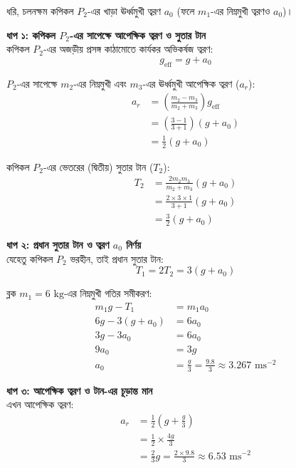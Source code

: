 \documentclass[12pt, a4paper]{article}
\begin{document}
\begin{tcolorbox}[solutionbox={সমাধান (Solution)}]
    \noindent
    ধরি, চলনক্ষম কপিকল $P_2$-এর খাড়া ঊর্ধ্বমুখী ত্বরণ $a_0$ (ফলে $m_1$-এর নিম্নমুখী ত্বরণও $a_0$)। 
    
    \vspace{0.5em}
    \noindent\textbf{ধাপ ১: কপিকল $P_2$-এর সাপেক্ষে আপেক্ষিক ত্বরণ ও সুতার টান} \\
    কপিকল $P_2$-এর অজড়ীয় প্রসঙ্গ কাঠামোতে কার্যকর অভিকর্ষজ ত্বরণ:
    \[ g_{\text{eff}} = g + a_0 \]
    
    $P_2$-এর সাপেক্ষে $m_2$-এর নিম্নমুখী এবং $m_3$-এর ঊর্ধ্বমুখী আপেক্ষিক ত্বরণ ($a_r$):
    \begin{align*}
        a_r &= \left(\frac{m_2 - m_3}{m_2 + m_3}\right) g_{\text{eff}} \\
            &= \left(\frac{3 - 1}{3 + 1}\right) (g + a_0) \\
            &= \frac{1}{2} (g + a_0)
    \end{align*}
    
    কপিকল $P_2$-এর ভেতরের (দ্বিতীয়) সুতার টান ($T_2$):
    \begin{align*}
        T_2 &= \frac{2 m_2 m_3}{m_2 + m_3} (g + a_0) \\
            &= \frac{2 \times 3 \times 1}{3 + 1} (g + a_0) \\
            &= \frac{3}{2} (g + a_0)
    \end{align*}
    
    \vspace{0.5em}
    \noindent\textbf{ধাপ ২: প্রধান সুতার টান ও ত্বরণ $a_0$ নির্ণয়} \\
    যেহেতু কপিকল $P_2$ ভরহীন, তাই প্রধান সুতার টান:
    \[ T_1 = 2 T_2 = 3 (g + a_0) \]
    
    ব্লক $m_1 = 6\text{ kg}$-এর নিম্নমুখী গতির সমীকরণ:
    \begin{align*}
        m_1 g - T_1 &= m_1 a_0 \\
        6g - 3(g + a_0) &= 6 a_0 \\
        3g - 3a_0 &= 6a_0 \\
        9a_0 &= 3g \\
        a_0 &= \frac{g}{3} = \frac{9.8}{3} \approx 3.267\text{ ms}^{-2}
    \end{align*}
    
    \vspace{0.5em}
    \noindent\textbf{ধাপ ৩: আপেক্ষিক ত্বরণ ও টান-এর চূড়ান্ত মান} \\
    এখন আপেক্ষিক ত্বরণ:
    \begin{align*}
        a_r &= \frac{1}{2} \left(g + \frac{g}{3}\right) \\
            &= \frac{1}{2} \times \frac{4g}{3} \\
            &= \frac{2}{3} g = \frac{2 \times 9.8}{3} \approx \mathbf{6.53}\text{ ms}^{-2}
    \end{align*}
    

\end{tcolorbox}
\end{document}

